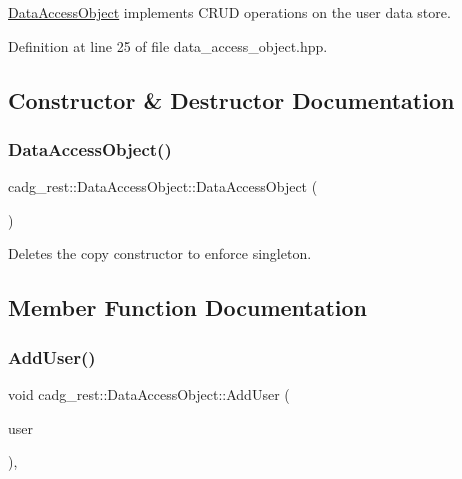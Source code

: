 \mbox{\hyperlink{classcadg__rest_1_1_data_access_object}{Data\+Access\+Object}} implements C\+R\+UD operations on the user data store. 

Definition at line 25 of file data\+\_\+access\+\_\+object.\+hpp.



\subsection{Constructor \& Destructor Documentation}
\mbox{\label{classcadg__rest_1_1_data_access_object_a406ab0c0f47900529133afc7db6c3bca}} 
\subsubsection{\texorpdfstring{DataAccessObject()}{DataAccessObject()}}
{\footnotesize\ttfamily cadg\+\_\+rest\+::\+Data\+Access\+Object\+::\+Data\+Access\+Object (\begin{DoxyParamCaption}\item[{\mbox{\hyperlink{classcadg__rest_1_1_data_access_object}{Data\+Access\+Object}} const \&}]{ }\end{DoxyParamCaption})\hspace{0.3cm}{\ttfamily [delete]}}



Deletes the copy constructor to enforce singleton. 



\subsection{Member Function Documentation}
\mbox{\label{classcadg__rest_1_1_data_access_object_a6d80c563e1cd526791fa69f32cd1d896}} 
\subsubsection{\texorpdfstring{AddUser()}{AddUser()}}
{\footnotesize\ttfamily void cadg\+\_\+rest\+::\+Data\+Access\+Object\+::\+Add\+User (\begin{DoxyParamCaption}\item[{\mbox{\hyperlink{structcadg__rest_1_1_user}{User}}}]{user }\end{DoxyParamCaption})\hspace{0.3cm}{\ttfamily [override]}, {\ttfamily [virtual]}}



